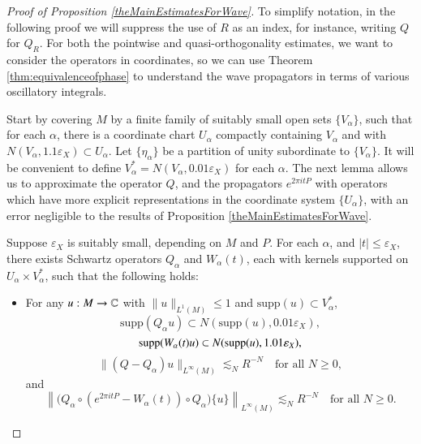 \begin{proof}[Proof of Proposition \ref{theMainEstimatesForWave}]

To simplify notation, in the following proof we will suppress the use of $R$ as an index, for instance, writing $Q$ for $Q_R$. For both the pointwise and quasi-orthogonality estimates, we want to consider the operators in coordinates, so we can use Theorem \ref{thm:equivalenceofphase} to understand the wave propagators in terms of various oscillatory integrals.

Start by covering $M$ by a finite family of suitably small open sets $\{ V_\alpha \}$, such that for each $\alpha$, there is a coordinate chart $U_\alpha$ compactly containing $V_\alpha$ and with $N(V_\alpha, 1.1 \varepsilon_X) \subset U_\alpha$. Let $\{ \eta_\alpha \}$ be a partition of unity subordinate to $\{ V_\alpha \}$. It will be convenient to define $V_\alpha^* = N(V_\alpha, 0.01 \varepsilon_X )$ for each $\alpha$. The next lemma allows us to approximate the operator $Q$, and the propagators $e^{2\pi i t P}$ with operators which have more explicit representations in the coordinate system $\{ U_\alpha \}$, with an error negligible to the results of Proposition \ref{theMainEstimatesForWave}.


\pagebreak[3]

\begin{lemma} \label{pseudodifferentialCoordinateLemma}
    Suppose $\varepsilon_X$ is suitably small, depending on $M$ and $P$. For each $\alpha$, and $|t| \leq \varepsilon_X$, there exists Schwartz operators $Q_\alpha$ and $W_\alpha(t)$, each with kernels supported on $U_\alpha \times V^*_\alpha$, such that the following holds:
    \begin{itemize}%
    \setlength\itemsep{0.5em}
        \item For any $u: M \to \operatorname{\mathbb{C}}$ with $\| u \|_{L^1(M)} \leq 1$ and $\text{supp}(u) \subset V_\alpha^*$,
        \[ \text{supp}(Q_{\alpha} u) \subset N(\text{supp}(u), 0.01 \varepsilon_X), \]
        \[ \operatorname{\text{supp}}(W_{\alpha}(t) u) \subset N(\operatorname{\text{supp}}(u), 1.01 \varepsilon_X ), \]
        \[ \| (Q - Q_{\alpha}) u \|_{L^\infty(M)} \lesssim_N R^{-N} \quad\text{for all $N \geq 0$}, \]
        and
        \[ \left\| \big( Q_{\alpha} \circ ( e^{2 \pi i t P} - W_{\alpha}(t) ) \circ Q_{\alpha} \big) \{ u \} \right\|_{L^\infty(M)} \lesssim_N R^{-N} \quad\text{for all $N \geq 0$}. \]


\end{itemize}
\end{lemma}
\end{proof}
